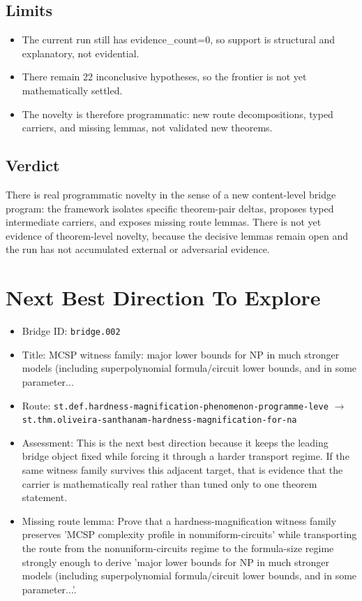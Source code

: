 \documentclass[11pt]{article}
\begin{document}
\subsection{Limits}
\begin{itemize}[leftmargin=*,itemsep=0.2em]
\item The current run still has evidence\_count=0, so support is structural and explanatory, not evidential.
\item There remain 22 inconclusive hypotheses, so the frontier is not yet mathematically settled.
\item The novelty is therefore programmatic: new route decompositions, typed carriers, and missing lemmas, not validated new theorems.
\end{itemize}

\subsection{Verdict}
There is real programmatic novelty in the sense of a new content-level bridge program: the framework isolates specific theorem-pair deltas, proposes typed intermediate carriers, and exposes missing route lemmas. There is not yet evidence of theorem-level novelty, because the decisive lemmas remain open and the run has not accumulated external or adversarial evidence.

\section{Next Best Direction To Explore}
\begin{itemize}[leftmargin=*,itemsep=0.25em]
\item Bridge ID: \texttt{bridge.002}
\item Title: MCSP witness family: major lower bounds for NP in much stronger models (including superpolynomial formula/circuit lower bounds, and in some parameter...
\item Route: \texttt{st.def.hardness-magnification-phenomenon-programme-leve} $\rightarrow$ \texttt{st.thm.oliveira-santhanam-hardness-magnification-for-na}
\item Assessment: This is the next best direction because it keeps the leading bridge object fixed while forcing it through a harder transport regime. If the same witness family survives this adjacent target, that is evidence that the carrier is mathematically real rather than tuned only to one theorem statement.
\item Missing route lemma: Prove that a hardness-magnification witness family preserves 'MCSP complexity profile in nonuniform-circuits' while transporting the route from the nonuniform-circuits regime to the formula-size regime strongly enough to derive 'major lower bounds for NP in much stronger models (including superpolynomial formula/circuit lower bounds, and in some parameter...'.
\end{itemize}
\end{document}
